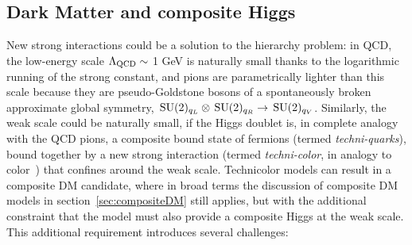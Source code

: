 \subsection{Dark Matter and composite Higgs}
\label{sec:DMcompositeH}
New strong interactions could be a solution to the hierarchy problem: in QCD, the low-energy scale $\Lambda_{\rm QCD} \sim$ 1 GeV is naturally small thanks to the logarithmic running of the strong constant,
and pions are parametrically lighter than this scale because they are pseudo-Goldstone bosons of a spontaneously broken approximate global symmetry, $\,{\rm SU}(2)_{q_L}\otimes \,{\rm SU}(2)_{q_R}\to \,{\rm SU}(2)_{q_V}$. 
Similarly, the weak scale could be naturally small, 
if the Higgs doublet is, in complete analogy with the QCD pions,
a composite bound state of fermions (termed {\em techni-quarks}), bound together by a new strong interaction 
(termed {\em techni-color}, in analogy to color~\cite{technicolor}) that confines around the weak scale.
Technicolor models can result in a composite DM candidate, where in broad terms the discussion of composite DM models in section~\ref{sec:compositeDM} still applies,
but with the additional constraint that the model  must also provide a composite Higgs at the weak scale.
This additional requirement introduces several challenges:
